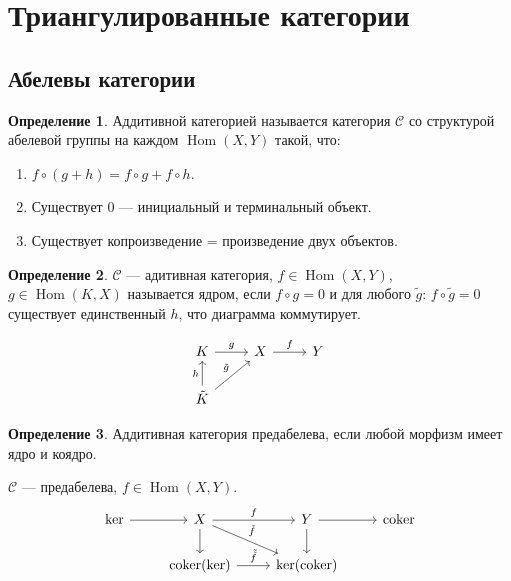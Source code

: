 \documentclass{article}
\title{}
\author{}
\date{}
\theoremstyle{definition}
\newtheorem*{definition}{Определение}
\theoremstyle{remark}
\DeclareMathOperator{\Hom}{Hom}
\DeclareMathOperator{\coker}{coker}
\newcommand{\Cat}{\mathcal{C}}
\newenvironment{enum}[2][\parindent]{\begin{enumerate}[nosep, wide, labelindent = #1, label=#2]}{\end{enumerate}}
\newenvironment{cd}{\begin{equation*}\begin{tikzcd}}{\end{tikzcd}\end{equation*}}
\begin{document}
\maketitle

\section{Триангулированные категории}

\setcounter{subsection}{-1}
\subsection{Абелевы категории}

\begin{definition}
    Аддитивной категорией называется категория $\Cat$ со структурой абелевой группы на каждом $\Hom(X, Y)$ такой, что:
    \begin{enum}{\arabic*)}
        \item $f \circ (g + h) = f \circ g + f \circ h$.
        \item Существует $0$ --- инициальный и терминальный объект.
        \item Существует копроизведение = произведение двух объектов.
    \end{enum}
\end{definition}

\begin{definition}
    $\mathcal{C}$ --- адитивная категория, $f \in \Hom(X, Y)$, $g \in \Hom(K, X)$ называется ядром, если $f \circ g = 0$ и для любого $\tilde g$: $f \circ \tilde{g} = 0$ существует единственный $h$, что диаграмма коммутирует.
\end{definition}

\begin{cd}
    K \rar["g"] & X \rar["f"] & Y \\
    \tilde{K} \ar[u, "h"] \ar[ur, "\tilde{g}"] 
\end{cd}

\begin{definition}
    Аддитивная категория предабелева, если любой морфизм имеет ядро и коядро.
\end{definition}

$\Cat$ --- предабелева, $f \in \Hom(X, Y)$.
\begin{cd}
\ker \rar & X \dar \rar["f"] \ar[dr, "\tilde{f}"] & Y \dar \rar & \coker \\
& \coker(\ker) \rar["\tilde{\tilde{f}}"] & \ker(\coker)
\end{cd}
\end{document}
